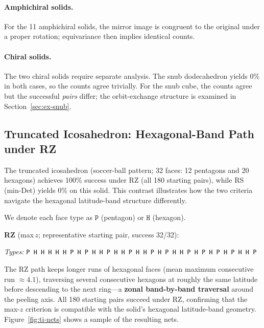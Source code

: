 \documentclass[12pt]{article}
\theoremstyle{definition}
\begin{document}
\paragraph{Amphichiral solids.}
For the 11 amphichiral solids, the mirror image is congruent to the
original under a proper rotation; equivariance then implies identical
counts.

\paragraph{Chiral solids.}
The two chiral solids require separate analysis.
The snub dodecahedron yields 0\% in both cases, so the counts agree
trivially.
For the snub cube, the counts agree but the successful \emph{pairs} differ;
the orbit-exchange structure is examined in Section~\ref{sec:ex-snub}.

\subsection{Truncated Icosahedron: Hexagonal-Band Path under RZ}
\label{sec:ex-ti}

The truncated icosahedron (soccer-ball pattern; 32 faces: 12 pentagons
and 20 hexagons) achieves 100\% success under RZ (all 180 starting pairs),
while RS (min-Det) yields 0\% on this solid.
This contrast illustrates how the two criteria navigate the hexagonal
latitude-band structure differently.

We denote each face type as $\mathtt{P}$ (pentagon) or $\mathtt{H}$
(hexagon).

\medskip
\noindent\textbf{RZ} (max\,$z$; representative starting pair, success 32/32):

\smallskip
\noindent\small
\textit{Types:} \texttt{P H H H H H P H P H H P H H P H H P H P H H P H P H P H P H H P}
\normalsize

The RZ path keeps longer runs of hexagonal faces (mean maximum consecutive
run $\approx 4.1$), traversing several consecutive hexagons at roughly the
same latitude before descending to the next ring---a \textbf{zonal band-by-band traversal}
around the peeling axis.
All 180 starting pairs succeed under RZ, confirming that the
max-$z$ criterion is compatible with the solid's hexagonal
latitude-band geometry.
Figure~\ref{fig:ti-nets} shows a sample of the resulting nets.

\end{document}
